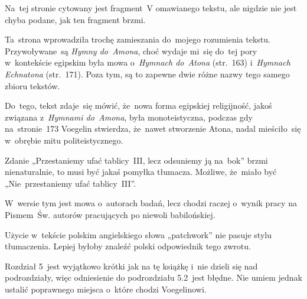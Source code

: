 \documentclass[a4paper,11pt]{article}
\begin{document}
\start {} Na~tej stronie cytowany jest fragment~V omawianego
tekstu, ale nigdzie nie jest chyba podane, jak ten fragment brzmi.

\vspace{\spaceFour}





\start {} Ta~strona wprowadziła trochę zamieszania do~mojego
rozumienia tekstu. Przywoływane~są \textit{Hymny do~Amona}, choć wydaje
mi~się do~tej pory w~kontekście egipskim była mowa o~\textit{Hymnach
  do~Atona} (str.~163) i~\textit{Hymnach Echnatona} (str.~171). Poza
tym, są to zapewne dwie różne nazwy tego samego zbioru tekstów.

Do~tego, tekst zdaje~się mówić, że~nowa forma egipskiej religijność,
jakoś związana z~\textit{Hymnami do~Amona}, była monoteistyczna, podczas
gdy na~stronie~173 Voegelin stwierdza, że~nawet stworzenie Atona,
nadal mieściło~się w~obrębie mitu politeistycznego.

\vspace{\spaceFour}





\start {} Zdanie „Przestaniemy ufać tablicy~III, lecz
odsuniemy ją na~bok” brzmi nienaturalnie, to musi być jakaś pomyłka
tłumacza. Możliwe, że~miało być „Nie~przestaniemy ufać tablicy~III”.

\vspace{\spaceFour}





\start {} W~wersie tym jest mowa o~autorach badań, lecz
chodzi raczej o~wynik pracy na Pismem~Św. autorów pracujących po
niewoli babilońskiej.

\vspace{\spaceFour}





\start {} Użycie w~tekście polskim angielskiego słowa
„patchwork” nie pasuje stylu tłumaczenia. Lepiej byłoby znaleźć
polski odpowiednik tego zwrotu.

\vspace{\spaceFour}





\start {} Rozdział 5~jest wyjątkowo krótki jak na tę
książkę i~nie dzieli się nad podrozdziały, więc odniesienie do
podrozdziału 5.2~jest błędne. Nie umiem jednak ustalić poprawnego
miejsca o~które chodzi Voegelinowi.
\end{document}
